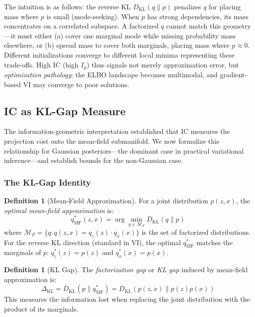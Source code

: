 \documentclass[10pt]{article} %
\theoremstyle{plain}
\theoremstyle{definition}
\newtheorem{definition}[theorem]{Definition}
\newcommand{\MI}{I}
\newcommand{\KL}{D_{\mathrm{KL}}}
\begin{document}
The intuition is as follows: the reverse KL $\KL(q\|p)$ penalizes $q$ for placing mass where $p$ is small (mode-seeking). When $p$ has strong dependencies, its mass concentrates on a correlated subspace. A factorized $q$ cannot match this geometry---it must either (a) cover one marginal mode while missing probability mass elsewhere, or (b) spread mass to cover both marginals, placing mass where $p \approx 0$. Different initializations converge to different local minima representing these trade-offs. High IC (high $\MI_p$) thus signals not merely approximation error, but \emph{optimization pathology}: the ELBO landscape becomes multimodal, and gradient-based VI may converge to poor solutions.

\subsection{IC as KL-Gap Measure}
\label{sec:kl-gap}

The information-geometric interpretation established that IC measures the projection cost onto the mean-field submanifold. We now formalize this relationship for Gaussian posteriors---the dominant case in practical variational inference---and establish bounds for the non-Gaussian case.

\subsubsection{The KL-Gap Identity}

\begin{definition}[Mean-Field Approximation]
For a joint distribution $p(z, x)$, the \emph{optimal mean-field approximation} is:
\begin{equation}
q_{\text{MF}}^*(z, x) = \arg\min_{q \in \mathcal{M}_F} D_{\text{KL}}(q \| p)
\end{equation}
where $\mathcal{M}_F = \{q : q(z, x) = q_z(z) \cdot q_x(x)\}$ is the set of factorized distributions. For the reverse KL direction (standard in VI), the optimal $q_{\text{MF}}^*$ matches the marginals of $p$: $q_z^*(z) = p(z)$ and $q_x^*(x) = p(x)$.
\end{definition}

\begin{definition}[KL Gap]
The \emph{factorization gap} or \emph{KL gap} induced by mean-field approximation is:
\begin{equation}
\Delta_{\text{KL}} = D_{\text{KL}}(p \| q_{\text{MF}}^*) = D_{\text{KL}}(p(z,x) \| p(z)p(x))
\end{equation}
This measures the information lost when replacing the joint distribution with the product of its marginals.
\end{definition}
\end{document}
